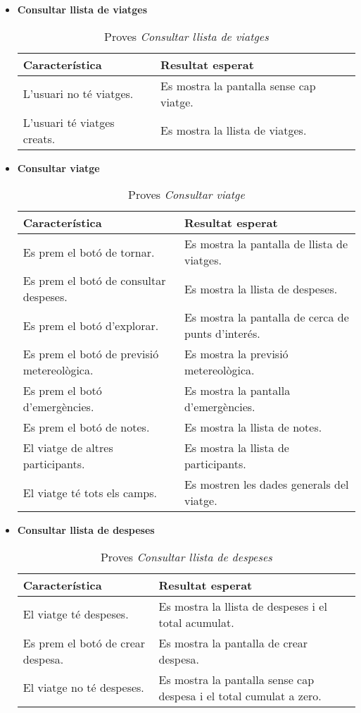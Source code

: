 \begin{itemize}
\clearpage

\item{}\textbf{Consultar llista de viatges}

\begin{table}[!h]
\centering
\begin{tabular}{|T|T|}
\hline
\textbf{Característica}  & \textbf{Resultat esperat} \\\hline
L'usuari no té viatges. & Es mostra la pantalla sense cap viatge.\\\hline
L'usuari té viatges creats. & Es mostra la llista de viatges.\\\hline
\end{tabular}
\label{}
\caption{Proves \textit{Consultar llista de viatges}}
\end{table}

\item{}\textbf{Consultar viatge}

\begin{table}[!h]
\centering
\begin{tabular}{|T|T|}
\hline
\textbf{Característica}  & \textbf{Resultat esperat} \\\hline
Es prem el botó de tornar. & Es mostra la pantalla de llista de viatges.\\\hline
Es prem el botó de consultar despeses. & Es mostra la llista de despeses.\\\hline
Es prem el botó d'explorar. & Es mostra la pantalla de cerca de punts d'interés.\\\hline
Es prem el botó de previsió metereològica. & Es mostra la previsió metereològica.\\\hline
Es prem el botó d'emergències. & Es mostra la pantalla d'emergències.\\\hline
Es prem el botó de notes. & Es mostra la llista de notes.\\\hline
El viatge de altres participants. & Es mostra la llista de participants.\\\hline
El viatge té tots els camps. & Es mostren les dades generals del viatge.\\\hline
\end{tabular}
\label{}
\caption{Proves \textit{Consultar viatge}}
\end{table}

\item{}\textbf{Consultar llista de despeses}

\begin{table}[!h]
\centering
\begin{tabular}{|T|T|}
\hline
\textbf{Característica}  & \textbf{Resultat esperat} \\\hline
El viatge té despeses. & Es mostra la llista de despeses i el total acumulat.\\\hline
Es prem el botó de crear despesa. & Es mostra la pantalla de crear despesa.\\\hline
El viatge no té despeses. & Es mostra la pantalla sense cap despesa i el total cumulat a zero.\\\hline
\end{tabular}
\label{}
\caption{Proves \textit{Consultar llista de despeses}}
\end{table}


\end{itemize}
